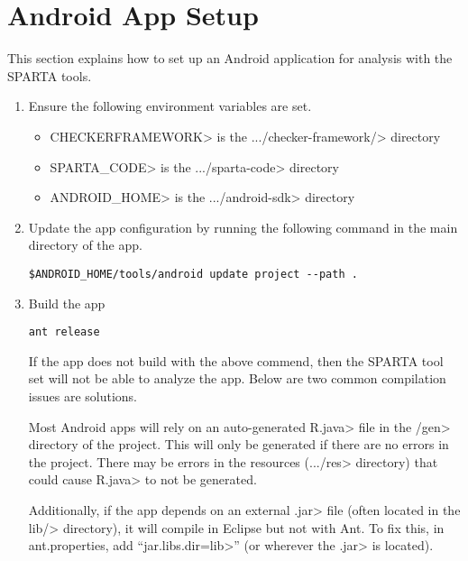 \section{Android App Setup\label{sec:antsetup}}

This section explains how to set up an Android application for analysis with the SPARTA tools.
\begin{enumerate}

\item
Ensure the following environment variables are set. 

\begin{itemize}
\item
\<CHECKERFRAMEWORK> is the
\<.../checker-framework/> directory

\item
\<SPARTA\_CODE> is the \<.../sparta-code> directory

\item
\<ANDROID\_HOME> is the \<.../android-sdk> directory

\end{itemize}

\item
Update the app configuration by running the following command in the main directory of the
app.
\begin{Verbatim}
$ANDROID_HOME/tools/android update project --path .
\end{Verbatim}

\item Build the app

\begin{Verbatim}
ant release
\end{Verbatim}
If the app does not build with the above commend, then the SPARTA tool set will 
not be able to analyze the app.  Below are two common compilation issues are solutions.

Most Android apps will rely on an auto-generated \<R.java> file
in the \</gen> directory of the project. This will only be generated
if there are no errors in the project. There may be errors in the
resources (\<.../res> directory) that could cause \<R.java> to not be
generated.

Additionally, if the app depends on an external \<.jar> file (often
located in the \<lib/> directory), it will compile in Eclipse but not
with Ant. To fix this, in ant.properties, add ``\<jar.libs.dir=lib>''
(or wherever the \<.jar> is located).






\end{enumerate}
